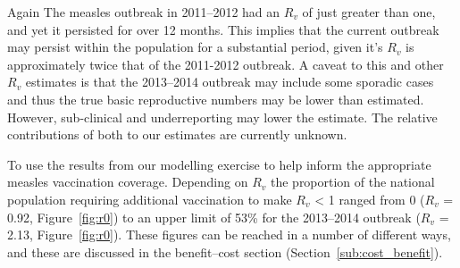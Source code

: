 \documentclass{article}
\begin{document}
Again The measles outbreak in 2011--2012 had an $R_v$ of just greater than one, and yet it persisted for over 12 months. This implies that the current outbreak may persist within the population for a substantial period, given it's $R_v$ is approximately twice that of the 2011-2012 outbreak. A caveat to this and other $R_v$ estimates is that the 2013--2014 outbreak may include some sporadic cases and thus the true basic reproductive numbers may be lower than estimated. However, sub-clinical and underreporting may lower the estimate. The relative contributions of both to our estimates are currently unknown.

To use the results from our modelling exercise to help inform the appropriate measles vaccination coverage. Depending on $R_v$ the proportion of the national population requiring additional vaccination to make $R_v$ < 1 ranged from 0 ($R_v$ = 0.92, Figure~\ref{fig:r0}) to an upper limit of 53\% for the 2013--2014 outbreak ($R_v$ = 2.13, Figure~\ref{fig:r0}). These figures can be reached in a number of different ways, and these are discussed in the benefit--cost section (Section~\ref{sub:cost_benefit}).
\end{document}
